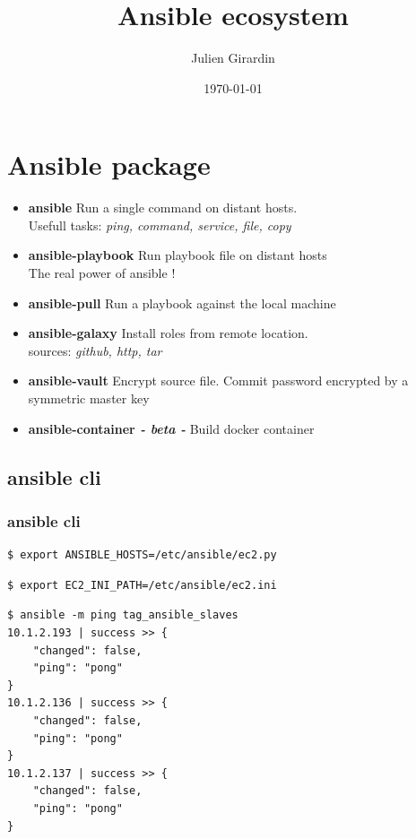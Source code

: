 \documentclass{beamer}
\title{Ansible ecosystem}
\author{Julien Girardin}
\date{\today}
\begin{document}
\maketitle{}

%

\section{Ansible package}

\begin{frame}
    \begin{itemize}
        \item {\bf ansible} Run a single command on distant hosts. \\
            Usefull tasks: \textit{ping, command, service, file, copy}
        \item {\bf ansible-playbook} Run playbook file on distant hosts \\
             The real power of ansible !
        \item {\bf ansible-pull} Run a playbook against the local machine \\
        \item {\bf ansible-galaxy} Install roles from remote location. \\
            sources: \textit{github, http, tar}
        \item {\bf ansible-vault} Encrypt source file.
            Commit password encrypted by a symmetric master key
        \item {\bf \color{gray} ansible-container \textit{- beta -}} Build docker container
    \end{itemize}
\end{frame}

\subsection{ansible cli}

\begin{frame}[fragile]
    \frametitle{ansible cli}
    \footnotesize{
        \begin{verbatim}
$ export ANSIBLE_HOSTS=/etc/ansible/ec2.py
        \end{verbatim}
        \begin{verbatim}
$ export EC2_INI_PATH=/etc/ansible/ec2.ini
        \end{verbatim}
        \begin{verbatim}
$ ansible -m ping tag_ansible_slaves
10.1.2.193 | success >> {
    "changed": false,
    "ping": "pong"
}
10.1.2.136 | success >> {
    "changed": false,
    "ping": "pong"
}
10.1.2.137 | success >> {
    "changed": false,
    "ping": "pong"
}
        \end{verbatim}
    }
\end{frame}
\end{document}

